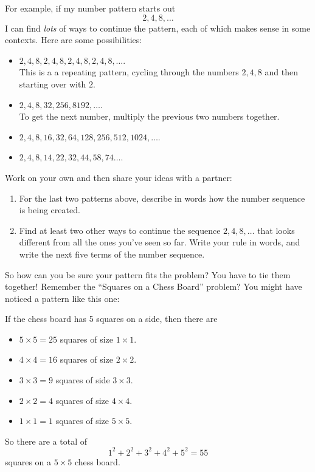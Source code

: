 For example, if my number pattern starts out 
\[
2, 4, 8, \dots
\]
I can find \emph{lots} of ways to continue the pattern, each of which makes sense in some contexts.  Here are some possibilities:
\begin{itemize}
\item
$2, 4, 8, 2, 4, 8, 2, 4, 8, 2, 4, 8, \dots$. \\
This is a a repeating pattern, cycling through the numbers $2, 4, 8$ and then starting over with $2$.\\

\item
$2, 4, 8, 32, 256, 8192,  \dots$. \\
To get the next number, multiply the previous two numbers together.\\

\item
$2, 4, 8, 16, 32, 64, 128, 256, 512, 1024,  \dots$. \\

\item
$2, 4, 8, 14, 22, 32, 44, 58, 74  \dots$. \\

\end{itemize}


\begin{thinkpair*}
Work on your own and then share your ideas with a partner:
\begin{enumerate}
\item
For the last two patterns above, describe in words how the number sequence is being created.  
\item
Find at least two other ways to continue the sequence $2, 4, 8, \dots$ that looks different from all the ones you've seen so far.  Write your rule in words, and write the next five terms of the number sequence.
\end{enumerate}
\end{thinkpair*}

So how can you be sure your pattern fits the problem?  You have to tie them together!  Remember the ``Squares on a Chess Board'' problem?  You might have noticed a pattern like this one:

If the chess board has 5 squares on a side, then there are
\begin{itemize}
\item
$5 \times 5 =25$ squares of size $1 \times 1$.
\item
$4 \times 4 = 16$ squares of size $2 \times 2$.
\item
$3 \times 3 =9$ squares of side $3 \times 3$.
\item 
$2 \times 2 = 4$ squares of size $4 \times 4$.
\item
$1 \times 1 = 1$ squares of size $5 \times 5$.
\end{itemize}
So there are a total of
\[
1^2 + 2^2 + 3^2 + 4^2 + 5^2 = 55
\]
squares on a $5 \times 5$ chess board.

